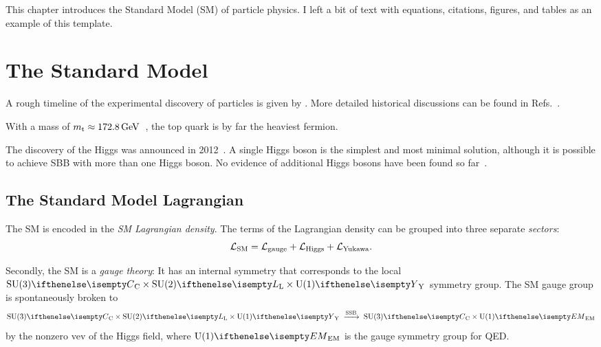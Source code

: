 

\label{sec:SM}

This chapter introduces the Standard Model (SM) of particle physics.
I left a bit of text with equations, citations, figures, and tables as an example of this template.


\section{The Standard Model}

A rough timeline of the experimental discovery of particles is given by .
More detailed historical discussions can be found in Refs.~\cite{particle_physics_history_50s,particle_physics_history_60s,particle_physics_Griffiths}.



With a mass of $m_{\text{t}}\approx172.8{\,\text{Ge\hspace{-.08em}V}}$~\cite[p.~32]{PDG_2022}, the top quark is by far the heaviest fermion.

The discovery of the Higgs was announced in 2012~\cite{Higgs_discovery_2012_CMS,Higgs_discovery_2012_ATLAS,Higgs_discovery_2013_CMS,Higgs_mass_2015_combined}. A single Higgs boson is the simplest and most minimal solution, although it is possible to achieve SBB with more than one Higgs boson. No evidence of additional Higgs bosons have been found so far~\cite{Higgs_extensions_LHC_2021}.



\subsection{The Standard Model Lagrangian}
The SM is encoded in the \emph{SM Lagrangian density}.
The terms of the Lagrangian density can be grouped into three separate \emph{sectors}:
\begin{equation}
  \mathcal{L}_\text{SM} = \mathcal{L}_\text{gauge} + \mathcal{L}_\text{Higgs} + \mathcal{L}_\text{Yukawa}.
\end{equation}

Secondly, the SM is a \emph{gauge theory}: It has an internal symmetry that corresponds to the local $\GSM$ symmetry group.
The SM gauge group is spontaneously broken to
\begin{equation}
  \GSM \;\xrightarrow{\mathrm{SSB}}\; \SU[C]{3}\times\U[EM]{1}
\end{equation}
by the nonzero vev of the Higgs field, where $\U[EM]{1}$ is the gauge symmetry group for QED.

